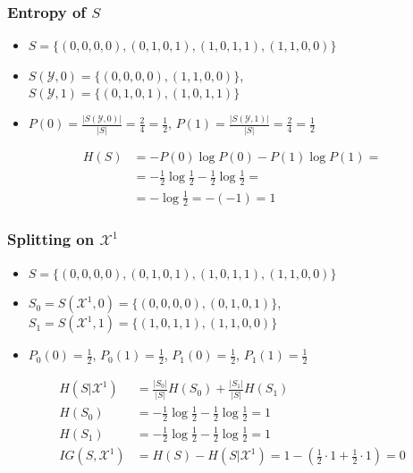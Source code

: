\documentclass[10pt]{beamer}
\begin{document}
\begin{frame}
  \frametitle{Entropy of $S$}
  \begin{itemize}
    \item {\color{red} $S=\{(0,0,0,0),(0,1,0,1),(1,0,1,1),(1,1,0,0)\}$}
	\item $S(\mathcal{Y},0)=\{(0,0,0,0),(1,1,0,0)\}$, $S(\mathcal{Y},1)=\{(0,1,0,1),(1,0,1,1)\}$
	\pause
	\item $P(0) = \frac {|S(\mathcal{Y},0)|} {|S|} = \frac 2 4 = \frac 1 2$, $P(1) = \frac {|S(\mathcal{Y},1)|} {|S|} = \frac 2 4 = \frac 1 2$
  \end{itemize}
  \pause
  \begin{align*}
	H(S)&=-P(0)\log P(0)-P(1)\log P(1)=\\
	&=-\frac{1}{2}\log\frac{1}{2}-\frac{1}{2}\log\frac{1}{2}=\\
    &=-\log\frac{1}{2}=-(-1)=1
  \end{align*}
\end{frame}

\begin{frame}
  \frametitle{Splitting on $\mathcal{X}^1$}
  \begin{itemize}
    \item {\color{red} $S=\{(0,0,0,0),(0,1,0,1),(1,0,1,1),(1,1,0,0)\}$}
    \item $S_0 = S(\mathcal{X}^1,0)=\{(0,0,0,0),(0,1,0,1)\}$, $S_1 = S(\mathcal{X}^1,1)=\{(1,0,1,1),(1,1,0,0)\}$
	\pause
	\item $P_0(0) = \frac 1 2$, $P_0(1) = \frac 1 2$, $P_1(0) = \frac 1 2$, $P_1(1) = \frac 1 2$
  \end{itemize}
  \pause
  \begin{align*}
	H(S|\mathcal{X}^1)&=\frac{|S_0|}{|S|}H(S_0)+\frac{|S_1|}{|S|}H(S_1)\\
	H(S_0)&=-\frac{1}{2}\log\frac{1}{2}-\frac{1}{2}\log\frac{1}{2}=1\\
	H(S_1)&=-\frac{1}{2}\log\frac{1}{2}-\frac{1}{2}\log\frac{1}{2}=1\\
	IG(S,\mathcal{X}^1)&=H(S)-H(S|\mathcal{X}^1)=1 - \left(\frac 1 2 \cdot 1 + \frac 1 2 \cdot 1 \right) = 0
  \end{align*}
\end{frame}
\end{document}
